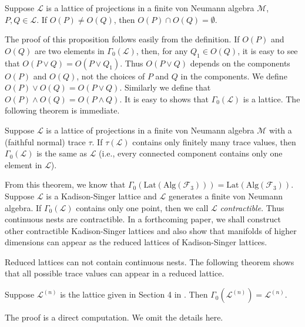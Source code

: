 \documentclass{pnastwo}
\newcommand{\F}{\mathcal F}
\newcommand{\LLL}{\mathcal L} %
\newcommand{\M}{\mathcal M}
\newcommand{\Lat}{\mathrm{Lat}}
\newcommand{\Alg}{\mathrm{Alg}}
\begin{document}
\begin{article}
\begin{proposition}
Suppose $\LLL$ is a
lattice of projections in a finite von Neumann algebra $\M$,
$P,Q\in\LLL$. If $O(P)\neq O(Q)$, then $O(P)\cap O(Q)=\emptyset$.
\end{proposition}

The proof of this proposition follows easily from the definition.
If $O(P)$ and $O(Q)$ are two elements in $\Gamma_0(\LLL)$, then, for
any $Q_1\in O(Q)$, it is easy to see that $O(P\vee Q)=O(P\vee
Q_1)$. Thus $O(P\vee Q)$ depends on the components $O(P)$ and
$O(Q)$, not the choices of $P$ and $Q$ in the components. We
define $O(P)\vee O(Q)=O(P\vee Q)$. Similarly we define that
$O(P)\wedge O(Q)=O(P\wedge Q)$. It is easy to shows that
$\Gamma_0(\LLL)$ is a lattice. The following theorem is immediate.

\begin{theorem}
Suppose $\LLL$ is a
lattice of projections in a finite von Neumann algebra $\M$ with a
(faithful normal) trace $\tau$. If $\tau(\LLL)$ contains only
finitely many trace values, then $\Gamma_0(\LLL)$ is the same as
$\LLL$ (i.e., every connected component contains only one element in
$\LLL$).
\end{theorem}

From this theorem, we know that
$\Gamma_0(\Lat(\Alg(\F_3)))=\Lat(\Alg(\F_3))$. Suppose $\LLL$ is a
Kadison-Singer lattice and $\LLL$ generates a finite von Neumann
algebra. If $\Gamma_0(\LLL)$ contains only one point, then we call
$\LLL$ {\it contractible}. Thus continuous nests are contractible. In
a forthcoming paper, we shall construct other contractible
Kadison-Singer lattices and also show that manifolds of higher
dimensions can appear as the reduced lattices of Kadison-Singer
lattices.

Reduced lattices can not contain continuous nests. The following
theorem shows that all possible trace values can appear in a
reduced lattice.

\begin{theorem}
Suppose $\LLL^{(n)}$ is
the lattice given in Section 4 in \cite{GY}. Then
$\Gamma_0(\LLL^{(n)})=\LLL^{(n)}$.
\end{theorem}

The proof is a direct computation. We omit the details here.




\end{article}
\end{document}
